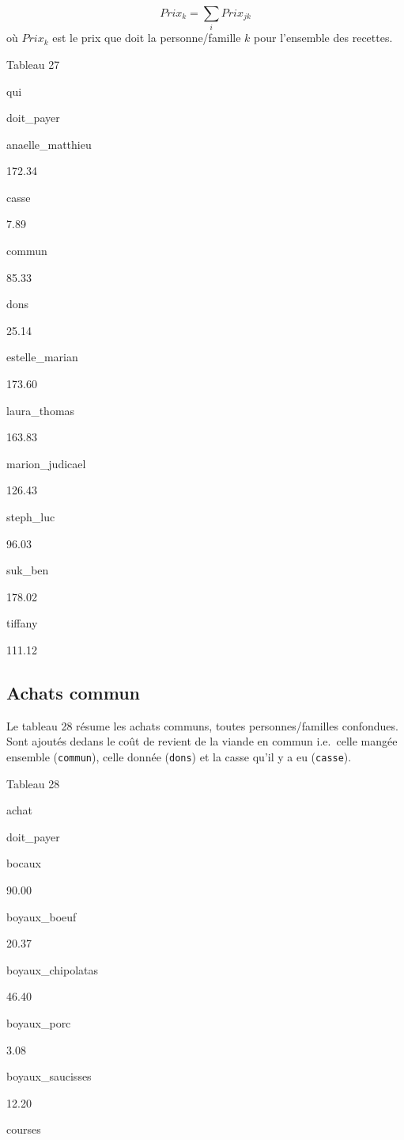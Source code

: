 \documentclass[]{article}
\begin{document}
\[Prix_{k} = \sum_{i} Prix_{jk}\] où \(Prix_{k}\) est le prix que doit
la personne/famille \(k\) pour l'ensemble des recettes.

Tableau 27

qui

doit\_payer

anaelle\_matthieu

172.34

casse

7.89

commun

85.33

dons

25.14

estelle\_marian

173.60

laura\_thomas

163.83

marion\_judicael

126.43

steph\_luc

96.03

suk\_ben

178.02

tiffany

111.12

\hypertarget{achats-commun}{%
\subsection{Achats commun}\label{achats-commun}}

Le tableau 28 résume les achats communs, toutes personnes/familles
confondues. Sont ajoutés dedans le coût de revient de la viande en
commun i.e.~celle mangée ensemble (\texttt{commun}), celle donnée
(\texttt{dons}) et la casse qu'il y a eu (\texttt{casse}).

Tableau 28

achat

doit\_payer

bocaux

90.00

boyaux\_boeuf

20.37

boyaux\_chipolatas

46.40

boyaux\_porc

3.08

boyaux\_saucisses

12.20

courses
\end{document}

